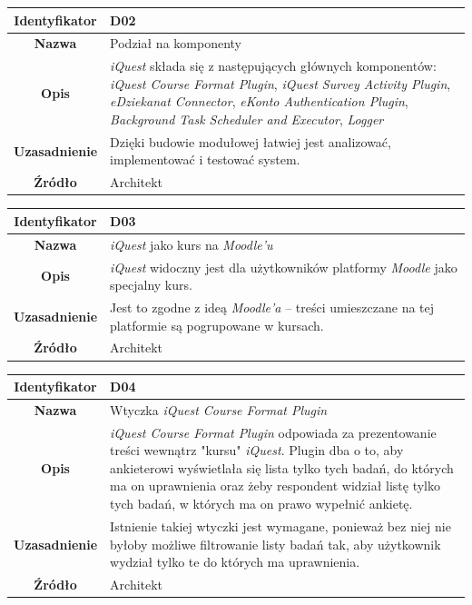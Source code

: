 \begin{table}[H]
\centering
\begin{tabular}{ | >{\bfseries}c | p{11cm} | }
\hline
%
Identyfikator & D02 \\ \hline
Nazwa & Podział na komponenty  \\ \hline
Opis & \textit{iQuest} składa się z następujących głównych komponentów: \textit{iQuest Course Format Plugin}, \textit{iQuest Survey Activity Plugin}, \textit{eDziekanat Connector}, \textit{eKonto Authentication Plugin}, \textit{Background Task Scheduler and Executor}, \textit{Logger}  \\ \hline
Uzasadnienie & Dzięki budowie modułowej łatwiej jest analizować, implementować i testować system. \\ \hline
Źródło & Architekt \\ \hline
%
\end{tabular}
\end{table}

\begin{table}[H]
\centering
\begin{tabular}{ | >{\bfseries}c | p{11cm} | }
\hline
%
Identyfikator & D03 \\ \hline
Nazwa & \textit{iQuest} jako kurs na \textit{Moodle'u}  \\ \hline
Opis & \textit{iQuest} widoczny jest dla użytkowników platformy \textit{Moodle} jako specjalny kurs. \\ \hline
Uzasadnienie & Jest to zgodne z ideą \textit{Moodle'a} -- treści umieszczane na tej platformie są pogrupowane w kursach. \\ \hline
Źródło & Architekt \\ \hline
%
\end{tabular}
\end{table}

\begin{table}[H]
\centering
\begin{tabular}{ | >{\bfseries}c | p{11cm} | }
\hline
%
Identyfikator & D04 \\ \hline
Nazwa & Wtyczka \textit{iQuest Course Format Plugin}  \\ \hline
Opis & \textit{iQuest Course Format Plugin} odpowiada za prezentowanie treści wewnątrz "kursu" \textit{iQuest}. Plugin dba o to, aby ankieterowi wyświetlała się lista tylko tych badań, do których ma on uprawnienia oraz żeby respondent widział listę tylko tych badań, w których ma on prawo wypełnić ankietę. \\ \hline
Uzasadnienie & Istnienie takiej wtyczki jest wymagane, ponieważ bez niej nie byłoby możliwe filtrowanie listy badań tak, aby użytkownik wydział tylko te do których ma uprawnienia. \\ \hline
Źródło & Architekt \\ \hline
%
\end{tabular}
\end{table}


